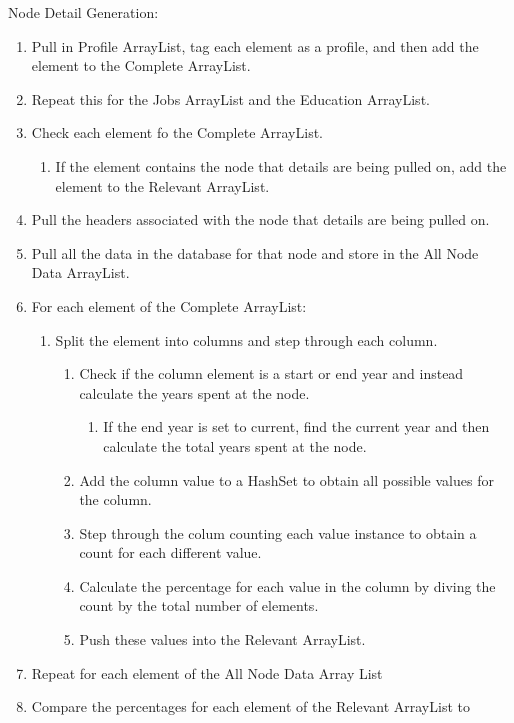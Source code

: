 Node Detail Generation:
\begin{enumerate}
  \item Pull in Profile ArrayList, tag each element as a profile, and then add
  the element to the Complete ArrayList.
  \item Repeat this for the Jobs ArrayList and the Education ArrayList.
  \item Check each element fo the Complete ArrayList.
  \begin{enumerate}
    \item If the element contains the node that details are being pulled on, add
    the element to the Relevant ArrayList.
  \end{enumerate}
  \item Pull the headers associated with the node that details are being pulled
  on.
  \item Pull all the data in the database for that node and store in the All
  Node Data ArrayList.
  \item For each element of the Complete ArrayList:
  \begin{enumerate}
    \item Split the element into columns and step through each column.
    \begin{enumerate}
    	\item Check if the column element is a start or end year and instead
    	calculate the years spent at the node.
    	\begin{enumerate}
    	  \item If the end year is set to current, find the current year and then
    	  calculate the total years spent at the node.
    	\end{enumerate}
    	\item Add the column value to a HashSet to obtain all possible values for
    	the column.
    	\item Step through the colum counting each value instance to obtain a count
    	for each different value.
    	\item Calculate the percentage for each value in the column by diving the
    	count by the total number of elements.
    	\item Push these values into the Relevant ArrayList.
    \end{enumerate} 
  \end{enumerate}
  \item Repeat for each element of the All Node Data Array List
  \item Compare the percentages for each element of the Relevant ArrayList to

\end{enumerate}
